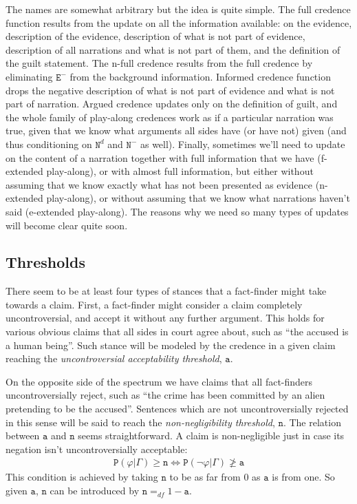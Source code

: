 \documentclass[10pt,leqno]{article}
\newcommand{\n}{\neg}
\begin{document}
 
 The names are somewhat arbitrary but the idea is quite simple. The full credence function results from the update on all the information available: on the evidence, description of the evidence, description of what is not part of evidence, description of all narrations and what is not part of them, and the definition of the guilt statement.  The n-full credence results from the full credence by eliminating $\mathtt{E}^-$ from the background information. Informed credence function drops the negative description of what is not part of evidence and what is not part of narration. Argued credence updates only on the definition of guilt, and the whole family of play-along credences work as if a particular narration was true, given that we know what arguments all sides have (or have not) given (and thus conditioning on $\mathtt{N}^d$ and $\mathtt{N}^-$ as well).  Finally, sometimes we'll need to update on the content of a narration together with full information that we have (f-extended play-along), or with almost full information, but  either without assuming that we know exactly what has not been presented as evidence  (n-extended play-along), or without assuming that we know what narrations haven't said (e-extended play-along).  The reasons why we need so many types of updates will become clear quite soon.










\subsection{Thresholds}


There seem to be  at least four types of stances that a fact-finder might take towards a claim. First, a fact-finder might consider a claim completely uncontroversial, and accept it without any further argument. This holds for various obvious claims that all sides in court agree about, such as ``the accused is a human being''. Such stance will be modeled by the credence in a given claim reaching the \emph{uncontroversial acceptability threshold}, $\mathtt{a}$. 

On the opposite side of the spectrum we have claims that all fact-finders uncontroversially reject, such as ``the crime has been committed by an alien pretending to be the accused''. Sentences which are not uncontroversially rejected in this sense will be said to reach the  \emph{non-negligibility threshold}, $\mathtt{n}$. The relation between $\mathtt{a}$ and $\mathtt{n}$ seems straightforward. A claim is non-negligible just in case its negation isn't uncontroversially acceptable:
\begin{align}
\tag{Negligible} \label{Negligible} \mathtt{P}(\varphi \vert \Gamma) \geq \mathtt{n} \Leftrightarrow \mathtt{P}(\n \varphi \vert \Gamma) \not \geq \mathtt{a}
\end{align}
\noindent This condition is achieved by taking $\mathtt{n}$ to be as far from 0 as $\mathtt{a}$ is from one. So given $\mathtt{a}$,  $\mathtt{n}$ can be introduced by $\mathtt{n}=_{df} 1-\mathtt{a}$.  
\end{document}

